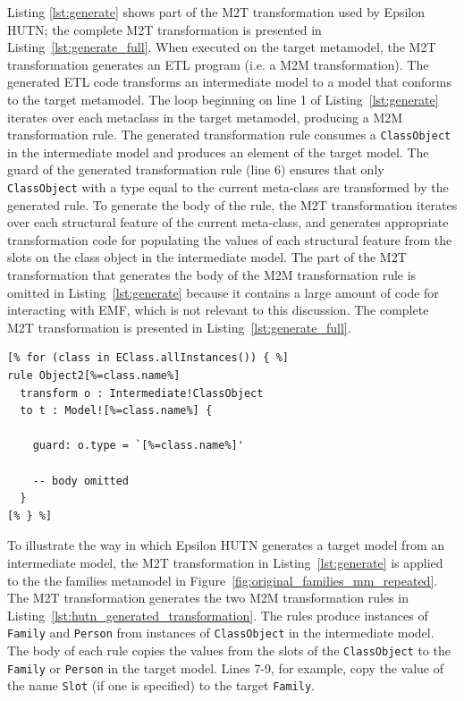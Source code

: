 Listing \ref{lst:generate} shows part of the M2T transformation used by Epsilon HUTN; the complete M2T transformation is presented in Listing~\ref{lst:generate_full}. When executed on the target metamodel, the M2T transformation generates an ETL program (i.e. a M2M transformation). The generated ETL code transforms an intermediate model to a model that conforms to the target metamodel. The loop beginning on line 1 of Listing~\ref{lst:generate} iterates over each metaclass in the target metamodel, producing a M2M transformation rule. The generated transformation rule consumes a \texttt{Cl\-a\-ssOb\-je\-ct} in the intermediate model and produces an element of the target model. The guard of the generated transformation rule (line 6) ensures that only \texttt{Cl\-a\-ssOb\-je\-ct} with a type equal to the current meta-class are transformed by the generated rule. To generate the body of the rule, the M2T transformation iterates over each structural feature of the current meta-class, and generates appropriate transformation code for populating the values of each structural feature from the slots on the class object in the intermediate model. The part of the M2T transformation that generates the body of the M2M transformation rule is omitted in Listing~\ref{lst:generate} because it contains a large amount of code for interacting with EMF, which is not relevant to this discussion. The complete M2T transformation is presented in Listing~\ref{lst:generate_full}.

\begin{lstlisting}[caption={[Higher-order transformation with EGL]Part of the M2T transformation (in EGL) that takes a target metamodel and generates an intermediate model to target model transformation (in ETL).}, label=lst:generate, language=EGL]
[% for (class in EClass.allInstances()) { %]
rule Object2[%=class.name%]
  transform o : Intermediate!ClassObject
  to t : Model![%=class.name%] {

    guard: o.type = `[%=class.name%]'

    -- body omitted
  }
[% } %]
\end{lstlisting}

To illustrate the way in which Epsilon HUTN generates a target model from an intermediate model, the M2T transformation in Listing~\ref{lst:generate} is applied to the the families metamodel in Figure~\ref{fig:original_families_mm_repeated}. The M2T transformation generates the two M2M transformation rules in Listing~\ref{lst:hutn_generated_transformation}. The rules produce instances of \texttt{Fa\-mi\-ly} and \texttt{Pe\-rs\-on} from instances of \texttt{Cl\-a\-ssOb\-je\-ct} in the intermediate model. The body of each rule copies the values from the slots of the \texttt{Cl\-as\-sOb\-je\-ct} to the \texttt{Fa\-mi\-ly} or \texttt{Pe\-rs\-on} in the target model. Lines 7-9, for example, copy the value of the name \texttt{Sl\-ot} (if one is specified) to the target \texttt{Fa\-mi\-ly}.


